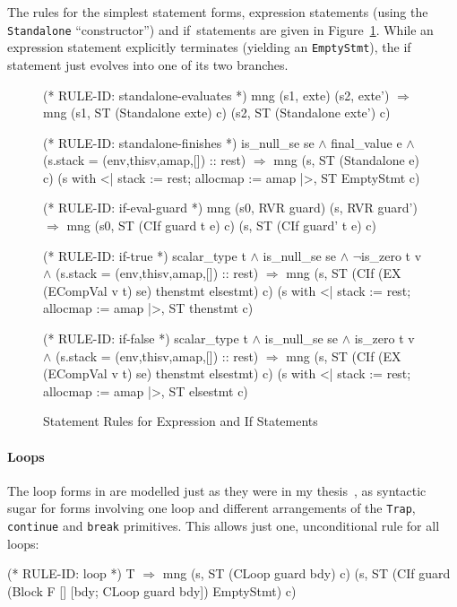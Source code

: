 \documentclass[11pt]{article}
\begin{document}
The rules for the simplest statement forms, expression statements
(using the \texttt{Standalone}
``constructor'') and
if~statements are given in Figure~\ref{fig:simple-stmts}.  While an
expression statement explicitly terminates (yielding an
\texttt{EmptyStmt}), the if statement just evolves into one of its two
branches.
\begin{figure}[htbp]
%
%
%
%
%
\begin{stdrule}
(* RULE-ID: standalone-evaluates *)
     mng (s1, exte) (s2, exte')
   \(\Rightarrow\)
     mng (s1, ST (Standalone exte) c)
         (s2, ST (Standalone exte') c)

(* RULE-ID: standalone-finishes *)
     is_null_se se \(\land\) final_value e \(\land\)
     (s.stack = (env,thisv,amap,[]) :: rest)
   \(\Rightarrow\)
     mng (s, ST (Standalone e) c)
         (s with <| stack := rest; allocmap := amap |>,
          ST EmptyStmt c)


(* RULE-ID: if-eval-guard *)
     mng (s0, RVR guard) (s, RVR guard')
   \(\Rightarrow\)
     mng (s0, ST (CIf guard t e) c)
         (s, ST (CIf guard' t e) c)


(* RULE-ID: if-true *)
     scalar_type t \(\land\) is_null_se se \(\land\) \(\neg\)is_zero t v \(\land\)
     (s.stack = (env,thisv,amap,[]) :: rest)
   \(\Rightarrow\)
     mng (s, ST (CIf (EX (ECompVal v t) se) thenstmt elsestmt) c)
         (s with <| stack := rest; allocmap := amap |>,
          ST thenstmt c)


(* RULE-ID: if-false *)
     scalar_type t \(\land\) is_null_se se \(\land\) is_zero t v \(\land\)
     (s.stack = (env,thisv,amap,[]) :: rest)
   \(\Rightarrow\)
     mng (s, ST (CIf (EX (ECompVal v t) se) thenstmt elsestmt) c)
         (s with <| stack := rest; allocmap := amap |>,
          ST elsestmt c)
\end{stdrule}
\caption{Statement Rules for Expression and If Statements}
\label{fig:simple-stmts}
\end{figure}

%
%
\paragraph{Loops} The loop forms in \cpp{} are modelled just as they
were in my thesis~\cite[\S3.4.5]{Norrish98}, as syntactic sugar for
forms involving one loop and different arrangements of the
\texttt{Trap}, \texttt{continue} and \texttt{break} primitives.
This allows just one, unconditional rule for all loops:%
\begin{stdrule}
(* RULE-ID: loop *)
     T
   \(\Rightarrow\)
     mng (s, ST (CLoop guard bdy) c)
         (s, ST (CIf guard (Block F [] [bdy; CLoop guard bdy])
                           EmptyStmt) c)
\end{stdrule}
\end{document}
